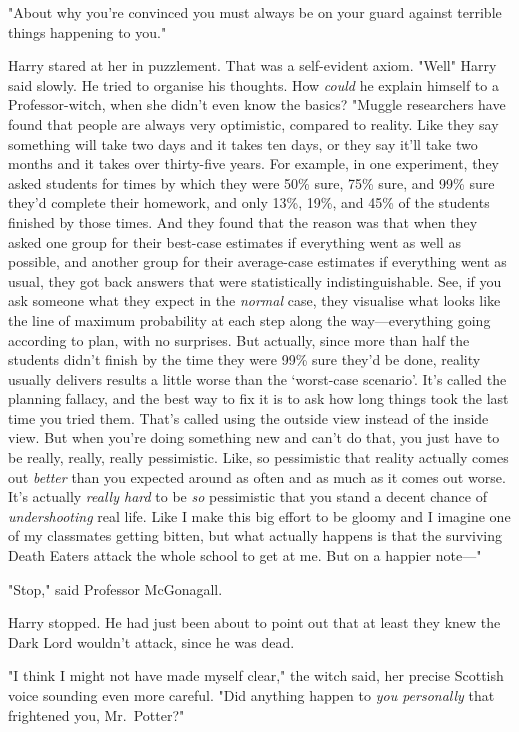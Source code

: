 "About why you're convinced you must always be on your guard against terrible
things happening to you."

Harry stared at her in puzzlement. That was a self-evident axiom.
"Well{\el}" Harry said slowly. He tried to organise his thoughts. How
\emph{could} he explain himself to a Professor-witch, when she didn't even know
the basics? "Muggle researchers have found that people are always very
optimistic, compared to reality. Like they say something will take two days and
it takes ten days, or they say it'll take two months and it takes over
thirty-five years. For example, in one experiment, they asked students for
times by which they were 50\% sure, 75\% sure, and 99\% sure they'd complete their
homework, and only 13\%, 19\%, and 45\% of the students finished by those times.
And they found that the reason was that when they asked one group for their
best-case estimates if everything went as well as possible, and another group
for their average-case estimates if everything went as usual, they got back
answers that were statistically indistinguishable. See, if you ask someone what
they expect in the \emph{normal} case, they visualise what looks like the line
of maximum probability at each step along the way—everything going according
to plan, with no surprises. But actually, since more than half the students
didn't finish by the time they were 99\% sure they'd be done, reality usually
delivers results a little worse than the `worst-case scenario'. It's called the
planning fallacy, and the best way to fix it is to ask how long things took the
last time you tried them. That's called using the outside view instead of the
inside view. But when you're doing something new and can't do that, you just
have to be really, really, really pessimistic. Like, so pessimistic that
reality actually comes out \emph{better} than you expected around as often and
as much as it comes out worse. It's actually \emph{really hard} to be \emph{so}
pessimistic that you stand a decent chance of \emph{undershooting} real life.
Like I make this big effort to be gloomy and I imagine one of my classmates
getting bitten, but what actually happens is that the surviving Death Eaters
attack the whole school to get at me. But on a happier note—"

"Stop," said Professor McGonagall.

Harry stopped. He had just been about to point out that at least they knew the
Dark Lord wouldn't attack, since he was dead.

"I think I might not have made myself clear," the witch said, her precise
Scottish voice sounding even more careful. "Did anything happen to \emph{you
personally} that frightened you, Mr.~Potter?"


